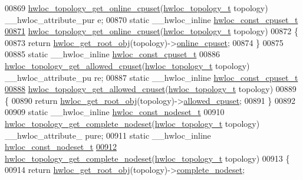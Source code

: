 \begin{DoxyCode}
00869 \hyperlink{a00060_gafeb07985e2cc66aee1da447aff0bcab8}{hwloc_topology_get_online_cpuset}(\hyperlink{a00039_ga9d1e76ee15a7dee158b786c30b6a6e38}{hwloc_topology_t} topology) \_\_hwloc\_attribute\_pur
      e;
00870 \textcolor{keyword}{static} \_\_hwloc\_inline \hyperlink{a00040_ga1f784433e9b606261f62d1134f6a3b25}{hwloc_const_cpuset_t}
\hypertarget{a00031_source_l00871}{}\hyperlink{a00060_gafeb07985e2cc66aee1da447aff0bcab8}{00871} \hyperlink{a00060_gafeb07985e2cc66aee1da447aff0bcab8}{hwloc_topology_get_online_cpuset}(\hyperlink{a00039_ga9d1e76ee15a7dee158b786c30b6a6e38}{hwloc_topology_t} topology)
00872 \{
00873   \textcolor{keywordflow}{return} \hyperlink{a00053_gadbf58f6e187efbdb3cd9a8e30311b7d7}{hwloc_get_root_obj}(topology)->\hyperlink{a00016_a8842d56c2975380f327ea401c5f53564}{online_cpuset};
00874 \}
00875 
00885 \textcolor{keyword}{static} \_\_hwloc\_inline \hyperlink{a00040_ga1f784433e9b606261f62d1134f6a3b25}{hwloc_const_cpuset_t}
00886 \hyperlink{a00060_ga08e3b14e1fe7642b383633d34c1f3c4a}{hwloc_topology_get_allowed_cpuset}(\hyperlink{a00039_ga9d1e76ee15a7dee158b786c30b6a6e38}{hwloc_topology_t} topology) \_\_hwloc\_attribute\_pu
      re;
00887 \textcolor{keyword}{static} \_\_hwloc\_inline \hyperlink{a00040_ga1f784433e9b606261f62d1134f6a3b25}{hwloc_const_cpuset_t}
\hypertarget{a00031_source_l00888}{}\hyperlink{a00060_ga08e3b14e1fe7642b383633d34c1f3c4a}{00888} \hyperlink{a00060_ga08e3b14e1fe7642b383633d34c1f3c4a}{hwloc_topology_get_allowed_cpuset}(\hyperlink{a00039_ga9d1e76ee15a7dee158b786c30b6a6e38}{hwloc_topology_t} topology)
00889 \{
00890   \textcolor{keywordflow}{return} \hyperlink{a00053_gadbf58f6e187efbdb3cd9a8e30311b7d7}{hwloc_get_root_obj}(topology)->\hyperlink{a00016_afa3c59a6dd3da8ffa48710780a1bfb34}{allowed_cpuset};
00891 \}
00892 
00909 \textcolor{keyword}{static} \_\_hwloc\_inline \hyperlink{a00040_ga2f5276235841ad66a79bedad16a5a10c}{hwloc_const_nodeset_t}
00910 \hyperlink{a00061_gaddb7a1f3d71510bb011189e0b8edf29f}{hwloc_topology_get_complete_nodeset}(\hyperlink{a00039_ga9d1e76ee15a7dee158b786c30b6a6e38}{hwloc_topology_t} topology) \_\_hwloc\_attribute\_
      pure;
00911 \textcolor{keyword}{static} \_\_hwloc\_inline \hyperlink{a00040_ga2f5276235841ad66a79bedad16a5a10c}{hwloc_const_nodeset_t}
\hypertarget{a00031_source_l00912}{}\hyperlink{a00061_gaddb7a1f3d71510bb011189e0b8edf29f}{00912} \hyperlink{a00061_gaddb7a1f3d71510bb011189e0b8edf29f}{hwloc_topology_get_complete_nodeset}(\hyperlink{a00039_ga9d1e76ee15a7dee158b786c30b6a6e38}{hwloc_topology_t} topology)
00913 \{
00914   \textcolor{keywordflow}{return} \hyperlink{a00053_gadbf58f6e187efbdb3cd9a8e30311b7d7}{hwloc_get_root_obj}(topology)->\hyperlink{a00016_ac38c4012127525ef74c5615c526f4c2e}{complete_nodeset};

\end{DoxyCode}
